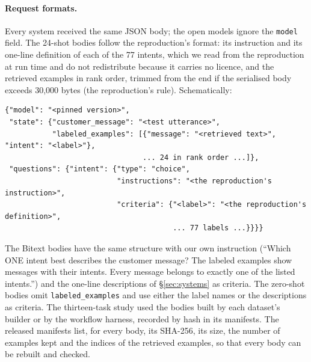 \paragraph{Request formats.} Every system received the same JSON body; the open models ignore the
\texttt{model} field. The 24-shot bodies follow the reproduction's format: its instruction and its one-line
definition of each of the 77 intents, which we read from the reproduction at run time and do not redistribute
because it carries no licence, and the retrieved examples in rank order, trimmed from the end if the serialised body
exceeds 30,000 bytes (the reproduction's rule). Schematically: %
\begin{verbatim}
{"model": "<pinned version>",
 "state": {"customer_message": "<test utterance>",
           "labeled_examples": [{"message": "<retrieved text>", "intent": "<label>"},
                                ... 24 in rank order ...]},
 "questions": {"intent": {"type": "choice",
                          "instructions": "<the reproduction's instruction>",
                          "criteria": {"<label>": "<the reproduction's definition>",
                                       ... 77 labels ...}}}}
\end{verbatim}
The Bitext bodies have the same structure with our own instruction (``Which ONE intent best describes the customer
message? The labeled examples show messages with their intents. Every message belongs to exactly one of the listed
intents.'') and the one-line descriptions of \S\ref{sec:systems} as criteria. The zero-shot bodies omit
\texttt{labeled\_examples} and use either the label names or the descriptions as criteria. The thirteen-task study
used the bodies built by each dataset's builder or by the workflow harness, recorded by hash in its manifests. The
released manifests list, for every body, its SHA-256, its size, the number of examples kept and the indices of the
retrieved examples, so that every body can be rebuilt and checked.

